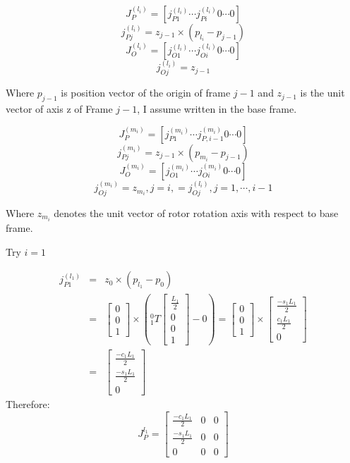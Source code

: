 \documentclass{article}
\begin{document}
\[
	J_P^{(l_i)} = [j_{P1}^{(l_i)} \cdots j_{Pi}^{(l_i)} 0 \cdots 0]
\]
\[ 
	j_{Pj}^{(l_i)} = z_{j-1} \times (p_{l_i} - p_{j-1}) 
\]
\[
	J_O^{(l_i)} = [j_{O1}^{(l_i)} \cdots j_{Oi}^{(l_i)} 0 \cdots 0]
\]
\[ 
	j_{Oj}^{(l_i)} = z_{j-1} 
\]

Where \( p_{j-1} \) is position vector of the origin of frame \(j-1\) and \(z_{j-1}\) is the unit vector of axis z of Frame \(j-1\), I assume written in the base frame.

\[
	J_P^{(m_i)} = [j_{P1}^{(m_i)} \cdots j_{P,i-1}^{(m_i)} 0 \cdots 0]
\]
\[ 
	j_{Pj}^{(m_i)} = z_{j-1} \times (p_{m_i} - p_{j-1}) 
\]
\[
	J_O^{(m_i)} = [j_{O1}^{(m_i)} \cdots j_{Oi}^{(m_i)} 0 \cdots 0]
\]
\[ 
	j_{Oj}^{(m_i)} = z_{m_i}, j = i, = j_{Oj}^{(l_i)}, j = 1,\cdots, i-1
\]

Where \(z_{m_i}\) denotes the unit vector of rotor rotation axis with respect to base frame.

Try $i = 1$

\begin{eqnarray*}
	j_{P1}^{(l_1)} &=& z_{0} \times (p_{l_1} - p_{0}) \\
		       &=& \begin{bmatrix} 0 \\ 0 \\ 1 \end{bmatrix} \times \left( ^0_1T\begin{bmatrix} \frac{L_1}{2} \\ 0 \\ 0 \\ 1 \end{bmatrix}  - 0 \right) = \begin{bmatrix} 0 \\ 0 \\ 1 \end{bmatrix} \times \begin{bmatrix} \frac{-s_1 L_1}{2} \\ \frac{c_1 L_1}{2} \\ 0 \end{bmatrix} \\
		       &=& \begin{bmatrix} \frac{-c_1 L_1}{2} \\ \frac{-s_1 L_1}{2} \\ 0 \end{bmatrix}
\end{eqnarray*}
Therefore:
\begin{displaymath}
	J_P^{l_1} = \begin{bmatrix} \frac{-c_1 L_1}{2} & 0 & 0 \\ \frac{-s_1 L_1}{2} & 0 & 0 \\ 0 & 0 & 0  \end{bmatrix}
\end{displaymath}
\end{document}
